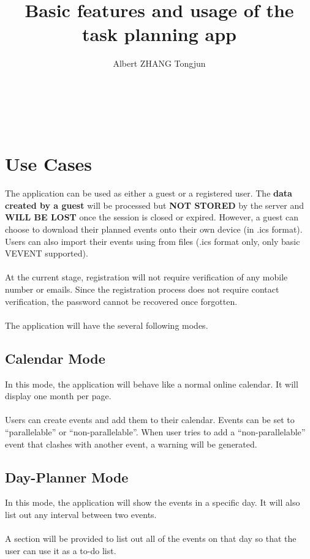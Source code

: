 \documentclass{article}[12pt]
\title{Basic features and usage of the task planning app}
\author{Albert ZHANG Tongjun}
\begin{document}
\maketitle
\tableofcontents
~\\~\\


\section{Use Cases}
The application can be used as either a guest or a registered user.
The \textbf{data created by a guest} will be processed but \textbf{NOT STORED} by the server and \textbf{WILL BE LOST} once the session is closed or expired.
However, a guest can choose to download their planned events onto their own device (in .ics format).
Users can also import their events using from files (.ics format only, only basic VEVENT supported).
~\\~\\
At the current stage, registration will not require verification of any mobile number or emails.
Since the registration process does not require contact verification, the password cannot be recovered once forgotten.
~\\~\\
The application will have the several following modes.
~\\

\subsection{Calendar Mode}
In this mode, the application will behave like a normal online calendar.
It will display one month per page.
~\\~\\
Users can create events and add them to their calendar.
Events can be set to ``parallelable'' or ``non-parallelable''.
When user tries to add a ``non-parallelable'' event that clashes with another event, a warning will be generated.
~\\

\subsection{Day-Planner Mode}
In this mode, the application will show the events in a specific day.
It will also list out any interval between two events.
~\\~\\
A section will be provided to list out all of the events on that day so that the user can use it as a to-do list.
~\\
\end{document}
